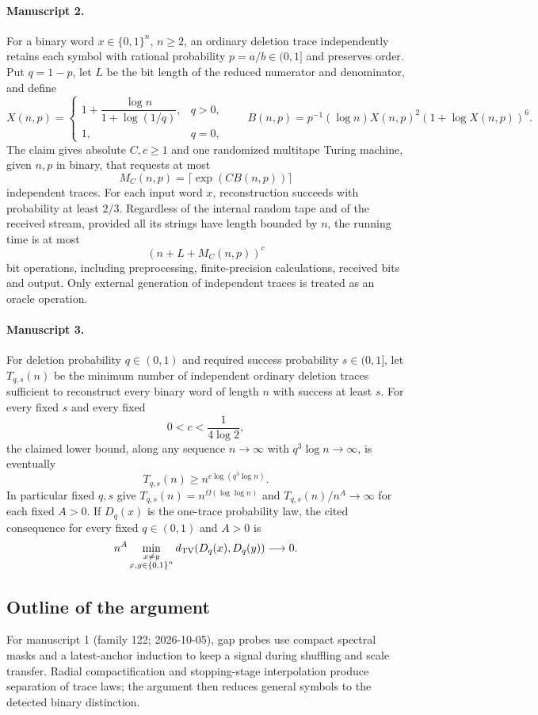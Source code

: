 \documentclass[11pt]{article}
\begin{document}
\paragraph{Manuscript 2.}
For a binary word $x\in\{0,1\}^n$, $n\ge2$, an ordinary deletion trace independently retains each symbol with rational probability $p=a/b\in(0,1]$ and preserves order. Put $q=1-p$, let $L$ be the bit length of the reduced numerator and denominator, and define
\[
 X(n,p)=\begin{cases}1+\dfrac{\log n}{1+\log(1/q)},&q>0,\\1,&q=0,\end{cases}
 \qquad B(n,p)=p^{-1}(\log n)X(n,p)^2(1+\log X(n,p))^6.
\]
The claim gives absolute $C,c\ge1$ and one randomized multitape Turing machine, given $n,p$ in binary, that requests at most
\[
 M_C(n,p)=\lceil\exp(CB(n,p))\rceil
\]
independent traces. For each input word $x$, reconstruction succeeds with probability at least $2/3$. Regardless of the internal random tape and of the received stream, provided all its strings have length bounded by $n$, the running time is at most
\[
 (n+L+M_C(n,p))^c
\]
bit operations, including preprocessing, finite-precision calculations, received bits and output. Only external generation of independent traces is treated as an oracle operation.

\paragraph{Manuscript 3.}
For deletion probability $q\in(0,1)$ and required success probability $s\in(0,1]$, let $T_{q,s}(n)$ be the minimum number of independent ordinary deletion traces sufficient to reconstruct every binary word of length $n$ with success at least $s$. For every fixed $s$ and every fixed
\[
 0<c<\frac1{4\log2},
\]
the claimed lower bound, along any sequence $n\to\infty$ with $q^3\log n\to\infty$, is eventually
\[
 T_{q,s}(n)\ge n^{c\log(q^3\log n)}.
\]
In particular fixed $q,s$ give $T_{q,s}(n)=n^{\Omega(\log\log n)}$ and $T_{q,s}(n)/n^A\to\infty$ for each fixed $A>0$. If $D_q(x)$ is the one-trace probability law, the cited consequence for every fixed $q\in(0,1)$ and $A>0$ is
\[
 n^A\min_{\substack{x\ne y\\x,y\in\{0,1\}^n}}
             d_{\rm TV}(D_q(x),D_q(y))\longrightarrow0.
\]

\subsection{Outline of the argument}
For manuscript 1 (family 122; 2026-10-05), gap probes use compact spectral masks and a latest-anchor induction to keep a signal during shuffling and scale transfer. Radial compactification and stopping-stage interpolation produce separation of trace laws; the argument then reduces general symbols to the detected binary distinction.
\end{document}
